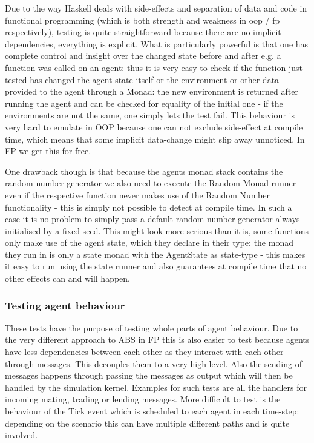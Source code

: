 Due to the way Haskell deals with side-effects and separation of data and code in functional programming (which is both strength and weakness in oop / fp respectively), testing is quite straightforward because there are no implicit dependencies, everything is explicit. What is particularly powerful is that one has complete control and insight over the changed state before and after e.g. a function was called on an agent: thus it is very easy to check if the function just tested has changed the agent-state itself or the environment or other data provided to the agent through a Monad: the new environment is returned after running the agent and can be checked for equality of the initial one - if the environments are not the same, one simply lets the test fail. This behaviour is very hard to emulate in OOP because one can not exclude side-effect at compile time, which means that some implicit data-change might slip away unnoticed. In FP we get this for free.

One drawback though is that because the agents monad stack contains the random-number generator we also need to execute the Random Monad runner even if the respective function never makes use of the Random Number functionality - this is simply not possible to detect at compile time. In such a case it is no problem to simply pass a default random number generator always initialised by a fixed seed. This might look more serious than it is, some functions only make use of the agent state, which they declare in their type: the monad they run in is only a state monad with the AgentState as state-type - this makes it easy to run using the state runner and also guarantees at compile time that no other effects can and will happen.

\subsubsection{Testing agent behaviour}
These tests have the purpose of testing whole parts of agent behaviour. Due to the very different approach to ABS in FP this is also easier to test because agents have less dependencies between each other as they interact with each other through messages. This decouples them to a very high level. Also the sending of messages happens through passing the messages as output which will then be handled by the simulation kernel. Examples for such tests are all the handlers for incoming mating, trading or lending messages. More difficult to test is the behaviour of the Tick event which is scheduled to each agent in each time-step: depending on the scenario this can have multiple different paths and is quite involved.

